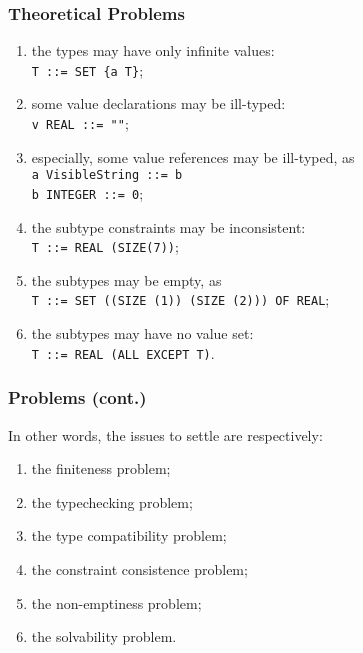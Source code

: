 \documentclass[compress,dvips,xcolor={dvipsnames},t]{beamer}
\begin{document}
\begin{frame}
\frametitle{Theoretical Problems}

\begin{enumerate}
  
  \item \label{finiteness} the types may have only infinite
        values:\\
        \texttt{T ::= SET \{a T\}};

  \item \label{type_conformance} some value declarations may be
        ill-typed:\\
        \texttt{v REAL ::= ""};

  \item \label{type_compatibility} especially, some value references
        may be ill-typed, as\\
        \texttt{a VisibleString ::= b}\\
        \texttt{b INTEGER ::= 0};

  \item \label{constraint_consistence} the subtype constraints may
        be inconsistent:\\
        \texttt{T ::= REAL (SIZE(7))};

  \item \label{subtype_non_emptiness} the subtypes may be empty, as\\
        \texttt{T ::= SET ((SIZE (1))  (SIZE (2))) OF REAL};
        
  \item \label{solvability} the subtypes may have no value set:\\
        \texttt{T ::= REAL (ALL EXCEPT T)}. 

\end{enumerate}

\end{frame}

\begin{frame}
\frametitle{Problems (cont.)}

In other words, the issues to settle are respectively:
\begin{enumerate}

  \item the finiteness problem;
 
  \item the typechecking problem;

  \item the type compatibility problem;

  \item the constraint consistence problem;

  \item the non-emptiness problem;

  \item the solvability problem.

\end{enumerate}

\end{frame}
\end{document}
